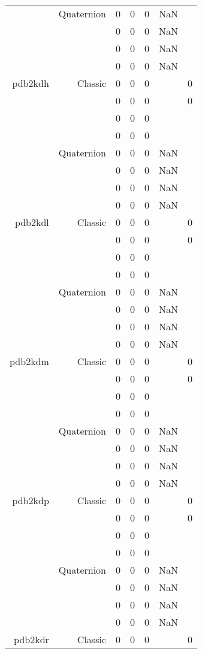\begin{xltabular}{\textwidth}{r|rcccSc}
& Quaternion & 0 & 0 & 0 & NaN & \\
& & 0 & 0 & 0 & NaN & \\
& & 0 & 0 & 0 & NaN & \\
& & 0 & 0 & 0 & NaN & \\ \addlinespace
pdb2kdh & Classic & 0 & 0 & 0 & & 0 \\
& & 0 & 0 & 0 & & 0 \\
& & 0 & 0 & 0 & & \\
& & 0 & 0 & 0 & & \\
& Quaternion & 0 & 0 & 0 & NaN & \\
& & 0 & 0 & 0 & NaN & \\
& & 0 & 0 & 0 & NaN & \\
& & 0 & 0 & 0 & NaN & \\ \addlinespace
pdb2kdl & Classic & 0 & 0 & 0 & & 0 \\
& & 0 & 0 & 0 & & 0 \\
& & 0 & 0 & 0 & & \\
& & 0 & 0 & 0 & & \\
& Quaternion & 0 & 0 & 0 & NaN & \\
& & 0 & 0 & 0 & NaN & \\
& & 0 & 0 & 0 & NaN & \\
& & 0 & 0 & 0 & NaN & \\ \addlinespace
pdb2kdm & Classic & 0 & 0 & 0 & & 0 \\
& & 0 & 0 & 0 & & 0 \\
& & 0 & 0 & 0 & & \\
& & 0 & 0 & 0 & & \\
& Quaternion & 0 & 0 & 0 & NaN & \\
& & 0 & 0 & 0 & NaN & \\
& & 0 & 0 & 0 & NaN & \\
& & 0 & 0 & 0 & NaN & \\ \addlinespace
pdb2kdp & Classic & 0 & 0 & 0 & & 0 \\
& & 0 & 0 & 0 & & 0 \\
& & 0 & 0 & 0 & & \\
& & 0 & 0 & 0 & & \\
& Quaternion & 0 & 0 & 0 & NaN & \\
& & 0 & 0 & 0 & NaN & \\
& & 0 & 0 & 0 & NaN & \\
& & 0 & 0 & 0 & NaN & \\ \addlinespace
pdb2kdr & Classic & 0 & 0 & 0 & & 0 \\

\end{xltabular}
